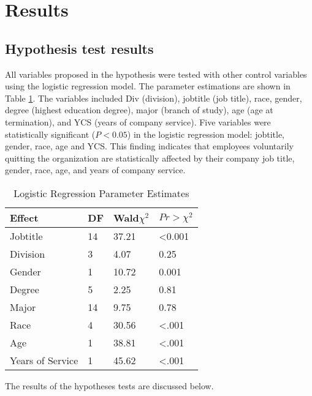 \section{Results}
\subsection{Hypothesis test results}

All variables proposed in the hypothesis were tested with other control variables using the logistic regression model. The parameter estimations are shown in Table \ref{tab:logitpar}. The variables included Div (division), jobtitle (job title), race, gender, degree (highest education degree), major (branch of study), age (age at termination), and YCS (years of company service). Five variables were statistically significant ($P<0.05$) in the logistic regression model: jobtitle, gender, race, age and YCS. This finding indicates that employees voluntarily quitting the organization are statistically affected by their company job title, gender, race, age, and years of company service.

\begin{table}[http]
	\centering
	\caption{Logistic Regression Parameter Estimates}
	\label{tab:logitpar}
	\begin{tabular}{llll}
		\toprule
		Effect           & DF & Wald$\chi^2$ & $Pr>\chi^2 $ \\
		\midrule
		Jobtitle         & 14 & 37.21                    & \textless0.001                     \\
		Division         & 3  & 4.07                     & 0.25                               \\
		Gender           & 1  & 10.72                    & 0.001                              \\
		Degree           & 5  & 2.25                     & 0.81                               \\
		Major            & 14 & 9.75                     & 0.78                               \\
		Race             & 4  & 30.56                    & \textless.001                      \\
		Age              & 1  & 38.81                    & \textless.001                      \\
		Years of Service & 1  & 45.62                    & \textless.001     \\
		\bottomrule                
	\end{tabular}
\end{table}
The results of the hypotheses tests are discussed below.

